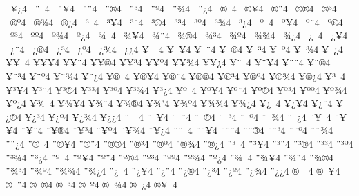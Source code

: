 {^^a0^^a5^^bf4
^^a0^^a8^^a04
^^a0^^a8^^a54
^^a0^^a8^^a84
^^a0^^a8^^ae4
^^a0^^a8^^b34
^^a0^^a8^^ba4
^^a0^^a8^^be4
^^a0^^a8^^bf4
^^a0^^ae^^a04
^^a0^^ae^^a54
^^a0^^ae^^a84
^^a0^^ae^^ae4
^^a0^^ae^^b34
^^a0^^ae^^ba4
^^a0^^ae^^be4
^^a0^^ae^^bf4
^^a0^^b3^^a04
^^a0^^b3^^a54
^^a0^^b3^^a84
^^a0^^b3^^ae4
^^a0^^b3^^b34
^^a0^^b3^^ba4
^^a0^^b3^^be4
^^a0^^b3^^bf4
^^a0^^ba^^a04
^^a0^^ba^^a54
^^a0^^ba^^a84
^^a0^^ba^^ae4
^^a0^^ba^^b34
^^a0^^ba^^ba4
^^a0^^ba^^be4
^^a0^^ba^^bf4
^^a0^^be^^a04
^^a0^^be^^a54
^^a0^^be^^a84
^^a0^^be^^ae4
^^a0^^be^^b34
^^a0^^be^^ba4
^^a0^^be^^be4
^^a0^^be^^bf4
^^a0^^bf^^a04
^^a0^^bf^^a54
^^a0^^bf^^a84
^^a0^^bf^^ae4
^^a0^^bf^^b34
^^a0^^bf^^ba4
^^a0^^bf^^be4
^^a0^^bf^^bf4
^^a5^^a0^^a04
^^a5^^a0^^a54
^^a5^^a0^^a84
^^a5^^a0^^ae4
^^a5^^a0^^b34
^^a5^^a0^^ba4
^^a5^^a0^^be4
^^a5^^a0^^bf4
^^a5^^a5^^a04
^^a5^^a5^^a54
^^a5^^a5^^a84
^^a5^^a5^^ae4
^^a5^^a5^^b34
^^a5^^a5^^ba4
^^a5^^a5^^be4
^^a5^^a5^^bf4
^^a5^^a8^^a04
^^a5^^a8^^a54
^^a5^^a8^^a84
^^a5^^a8^^ae4
^^a5^^a8^^b34
^^a5^^a8^^ba4
^^a5^^a8^^be4
^^a5^^a8^^bf4
^^a5^^ae^^a04
^^a5^^ae^^a54
^^a5^^ae^^a84
^^a5^^ae^^ae4
^^a5^^ae^^b34
^^a5^^ae^^ba4
^^a5^^ae^^be4
^^a5^^ae^^bf4
^^a5^^b3^^a04
^^a5^^b3^^a54
^^a5^^b3^^a84
^^a5^^b3^^ae4
^^a5^^b3^^b34
^^a5^^b3^^ba4
^^a5^^b3^^be4
^^a5^^b3^^bf4
^^a5^^ba^^a04
^^a5^^ba^^a54
^^a5^^ba^^a84
^^a5^^ba^^ae4
^^a5^^ba^^b34
^^a5^^ba^^ba4
^^a5^^ba^^be4
^^a5^^ba^^bf4
^^a5^^be^^a04
^^a5^^be^^a54
^^a5^^be^^a84
^^a5^^be^^ae4
^^a5^^be^^b34
^^a5^^be^^ba4
^^a5^^be^^be4
^^a5^^be^^bf4
^^a5^^bf^^a04
^^a5^^bf^^a54
^^a5^^bf^^a84
^^a5^^bf^^ae4
^^a5^^bf^^b34
^^a5^^bf^^ba4
^^a5^^bf^^be4
^^a5^^bf^^bf4
^^a8^^a0^^a04
^^a8^^a0^^a54
^^a8^^a0^^a84
^^a8^^a0^^ae4
^^a8^^a0^^b34
^^a8^^a0^^ba4
^^a8^^a0^^be4
^^a8^^a0^^bf4
^^a8^^a5^^a04
^^a8^^a5^^a54
^^a8^^a5^^a84
^^a8^^a5^^ae4
^^a8^^a5^^b34
^^a8^^a5^^ba4
^^a8^^a5^^be4
^^a8^^a5^^bf4
^^a8^^a8^^a04
^^a8^^a8^^a54
^^a8^^a8^^a84
^^a8^^a8^^ae4
^^a8^^a8^^b34
^^a8^^a8^^ba4
^^a8^^a8^^be4
^^a8^^a8^^bf4
^^a8^^ae^^a04
^^a8^^ae^^a54
^^a8^^ae^^a84
^^a8^^ae^^ae4
^^a8^^ae^^b34
^^a8^^ae^^ba4
^^a8^^ae^^be4
^^a8^^ae^^bf4
^^a8^^b3^^a04
^^a8^^b3^^a54
^^a8^^b3^^a84
^^a8^^b3^^ae4
^^a8^^b3^^b34
^^a8^^b3^^ba4
^^a8^^b3^^be4
^^a8^^b3^^bf4
^^a8^^ba^^a04
^^a8^^ba^^a54
^^a8^^ba^^a84
^^a8^^ba^^ae4
^^a8^^ba^^b34
^^a8^^ba^^ba4
^^a8^^ba^^be4
^^a8^^ba^^bf4
^^a8^^be^^a04
^^a8^^be^^a54
^^a8^^be^^a84
^^a8^^be^^ae4
^^a8^^be^^b34
^^a8^^be^^ba4
^^a8^^be^^be4
^^a8^^be^^bf4
^^a8^^bf^^a04
^^a8^^bf^^a54
^^a8^^bf^^a84
^^a8^^bf^^ae4
^^a8^^bf^^b34
^^a8^^bf^^ba4
^^a8^^bf^^be4
^^a8^^bf^^bf4
^^ae^^a0^^a04
^^ae^^a0^^a54
^^ae^^a0^^a84
^^ae^^a0^^ae4
^^ae^^a0^^b34
^^ae^^a0^^ba4
^^ae^^a0^^be4
^^ae^^a0^^bf4
^^ae^^a5^^a04
}
